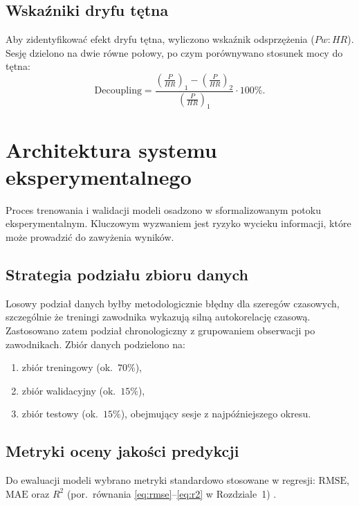 \subsection{Wskaźniki dryfu tętna}

Aby zidentyfikować efekt dryfu tętna, wyliczono wskaźnik odsprzężenia ($Pw\!:\!HR$).
Sesję dzielono na dwie równe połowy, po czym porównywano stosunek mocy do tętna:
\begin{equation}
\label{eq:decoupling}
\mathrm{Decoupling} =
\frac{\left(\frac{P}{HR}\right)_1 - \left(\frac{P}{HR}\right)_2}{\left(\frac{P}{HR}\right)_1}\cdot 100\%.
\end{equation}

\section{Architektura systemu eksperymentalnego}

Proces trenowania i walidacji modeli osadzono w sformalizowanym potoku eksperymentalnym.
Kluczowym wyzwaniem jest ryzyko wycieku informacji, które może prowadzić do zawyżenia wyników.

\subsection{Strategia podziału zbioru danych}

Losowy podział danych byłby metodologicznie błędny dla szeregów czasowych, szczególnie że treningi zawodnika wykazują silną autokorelację czasową. Zastosowano zatem podział chronologiczny z grupowaniem obserwacji po zawodnikach.
Zbiór danych podzielono na:
\begin{enumerate}
  \item zbiór treningowy (ok.\ $70\%$),
  \item zbiór walidacyjny (ok.\ $15\%$),
  \item zbiór testowy (ok.\ $15\%$), obejmujący sesje z najpóźniejszego okresu.
\end{enumerate}

\subsection{Metryki oceny jakości predykcji}

Do ewaluacji modeli wybrano metryki standardowo stosowane w regresji:
$\mathrm{RMSE}$, $\mathrm{MAE}$ oraz $R^2$ (por.\ równania \ref{eq:rmse}--\ref{eq:r2} w Rozdziale~1) \cite{hastie2009esl,james2021isl,nvidia_regression_metrics}.

